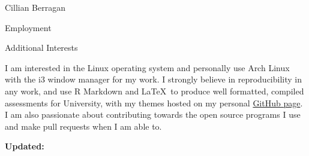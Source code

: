 \documentclass{scrartcl}
\begin{document}
\begin{cv}{Cillian Berragan}
\begin{cvlist}{Employment}
\end{cvlist}


\begin{cvlist}{Additional Interests}
\item[]

    \small I am interested in the Linux operating system and personally use Arch Linux with the i3 window manager for my work. I strongly believe in reproducibility in any work, and use R Markdown and \LaTeX\ to produce well formatted, compiled assessments for University, with my themes hosted on my personal \href{https://github.com/cjber/uolrmarkdown}{GitHub page}. I am also passionate about contributing towards the open source programs I use and make pull requests when I am able to.


\end{cvlist}

\vfill

\small \textbf{Updated:} \end{cv}
\end{document}
